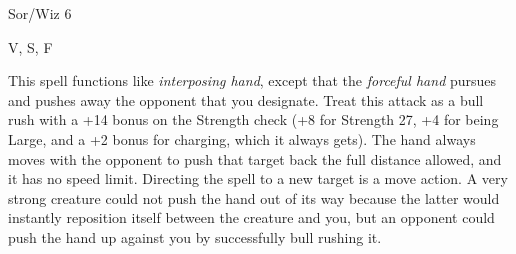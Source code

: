 
\begin{description*}
\item[Level:] Sor/Wiz 6
\item[Components:] V, S, F
\end{description*}

This spell functions like \textit{interposing hand}, except that the \textit{forceful
hand} pursues and pushes away the opponent that you designate. Treat this attack
as a bull rush with a +14 bonus on the Strength check (+8 for Strength 27, +4 for
being Large, and a +2 bonus for charging, which it always gets). The hand always
moves with the opponent to push that target back the full distance allowed, and
it has no speed limit. Directing the spell to a new target is a move action.
A very strong creature could not push the hand out of its way because the latter
would instantly reposition itself between the creature and you, but an opponent
could push the hand up against you by successfully bull rushing it.